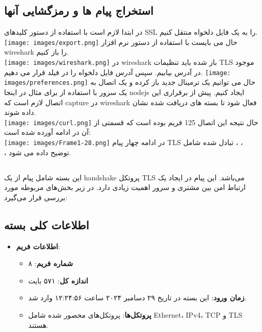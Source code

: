 \subsection*{استخراج پیام ها و رمزگشایی آنها}
در ابتدا لازم است با استفاده از دستور  کلیدهای SSL را به یک فایل دلخواه منتقل کنیم.\\
\texttt{[image: images/export.png]}
حال می بایست با استفاده از دستور  نرم افزار wireshark را باز کنیم.\\
\texttt{[image: images/wireshark.png]}
در wireshark باز شده باید تنظیمات TLS موجود در آدرس  بیابیم. سپس آدرس فایل دلخواه را در فیلد  قرار می دهیم.
\texttt{[image: images/preferences.png]}
حال می توانیم یک ترمینال جدید باز کرده و یک اتصال به یک سرور با استفاده از  برای مثال در اینجا nodejs ایجاد کنیم. پیش از برقراری این اتصال لازم است که capture در wireshark فعال شود تا بسته های دریافت شده نشان داده شوند.\\
\texttt{[image: images/curl.png]}
حال نتیجه این اتصال 125 فریم بوده است که قسمتی از آن در ادامه آورده شده است:\\
\texttt{[image: images/Frame1-28.png]}
در ادامه چهار پیام TLS تبادل شده شامل ، ،\\ ،  توضیح داده می شود.
\subsection*{}
این بسته شامل پیام  از یک handshake پروتکل TLS می‌باشد. این پیام در ایجاد یک ارتباط امن بین مشتری و سرور اهمیت زیادی دارد. در زیر بخش‌های مربوطه مورد بررسی قرار می‌گیرد:

\subsection*{اطلاعات کلی بسته}
\begin{itemize}[label={--}]
    \item \textbf{اطلاعات فریم}:
    \begin{itemize}
        \item \textbf{شماره فریم}: ۸
        \item \textbf{اندازه کل}: ۵۷۱ بایت
        \item \textbf{زمان ورود}: این بسته در تاریخ ۲۹ دسامبر ۲۰۲۴ ساعت ۱۲:۲۴:۵۶ وارد شد.
        \item \textbf{پروتکل‌ها}: پروتکل‌های محصور شده شامل Ethernet، IPv4، TCP و TLS هستند.
    \end{itemize}
\end{itemize}

